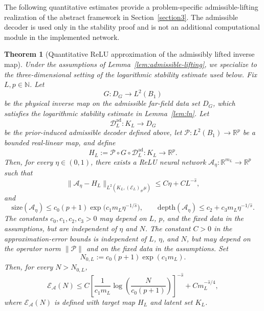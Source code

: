 \documentclass{article}
\numberwithin{equation}{section}
\theoremstyle{plain}
\newtheorem{theorem}{Theorem}[section]
\begin{document}
The following quantitative estimates provide a problem-specific admissible-lifting realization of the abstract framework in Section~\ref{section3}. The admissible decoder is used only in the stability proof and is not an additional computational module in the implemented network.
	
	\begin{theorem}[Quantitative ReLU approximation of the admissibly lifted inverse map]
	\label{thm:A-approximation}
	Under the assumptions of Lemma~\ref{lem:admissible-lifting},
	we specialize to the three-dimensional setting of the logarithmic stability estimate used below. Fix $L,p\in\mathbb N$. Let
	\begin{equation*}
	G:D_G\to L^2(B_1)
	\end{equation*}
	be the physical inverse map on the admissible far-field data set $D_G$, which satisfies the logarithmic stability estimate in
	Lemma~\ref{lem:ln}. Let
	\begin{equation*}
	\mathcal D_L^{\mathrm{ad}}:K_L\to D_G
	\end{equation*}
	be the prior-induced admissible decoder defined above, let
	$\mathcal P:L^2(B_1)\to\mathbb R^p$ be a bounded
	real-linear map, and define
	\begin{equation*}
	H_L:=\mathcal P\circ G\circ\mathcal D_L^{\mathrm{ad}}:K_L\to\mathbb R^p.
	\end{equation*}
	Then, for every $\eta\in(0,1)$, there exists a ReLU neural network $\mathcal A_\eta:\mathbb R^{m_L}\to\mathbb R^p$ such that
	\begin{equation*}
	\|\mathcal A_\eta-H_L\|_{L^2(K_L,(\mathcal E_L)_{\#}\mu)}
	\le C\eta+CL^{-\hat s},
	\end{equation*}
	and
	\begin{equation*}
	\mathrm{size}(\mathcal A_\eta)
	\le c_0(p+1)\exp \bigl(c_1m_L\eta^{-1/\hat s}\bigr),
	\qquad
	\mathrm{depth}(\mathcal A_\eta)
	\le c_2+c_3m_L\eta^{-1/\hat s}.
	\end{equation*}
	The constants $c_0,c_1,c_2,c_3>0$ may depend on $L$, $p$, and the fixed data in the assumptions, but are independent of $\eta$ and $N$. The constant $C>0$ in the approximation-error bounds is independent of $L$, $\eta$, and $N$, but may depend on the operator norm $\|\mathcal P\|$ and on the fixed data in the assumptions. Set
	\begin{equation*}
	N_{0,L}:=c_0(p+1)\exp(c_1m_L).
	\end{equation*}
	Then, for every $N> N_{0,L}$,
	\begin{equation}\label{eq:scattering-approximation-error}
	\mathscr E_{\mathcal A}(N)
	\le
	C\left[
	\frac{1}{c_1m_L}
	\log\!\left(\frac{N}{c_0(p+1)}\right)
	\right]^{-\hat s}
	+Cm_L^{-\hat s/4},
	\end{equation}
	where $\mathscr E_{\mathcal A}(N)$ is defined with target map $H_L$ and latent set $K_L$.
	\end{theorem}
\end{document}
